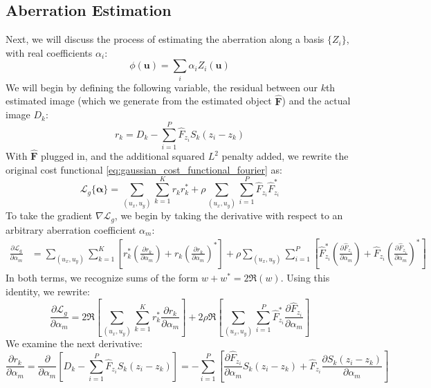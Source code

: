 \documentclass{article}
\begin{document}
\subsection{Aberration Estimation}
Next, we will discuss the process of estimating the aberration along a basis $\{Z_i\}$, with real coefficients $\alpha_i$:
\begin{equation}
\phi(\mathbf{u}) = \sum_i \alpha_i Z_i(\mathbf{u})
\end{equation}
We will begin by defining the following variable, the residual between our $k$th estimated image (which we generate from the estimated object $\hat{\mathbf{F}}$) and the actual image $D_k$:
\begin{equation}
r_k = D_k - \sum_{i=1}^P \hat{F}_{z_i} S_{k}(z_i - z_k)
\end{equation}
With $\hat{\mathbf{F}}$ plugged in, and the additional squared $L^2$ penalty added, we rewrite the original cost functional \autoref{eq:gaussian_cost_functional_fourier} as:
\begin{equation}
\mathcal{L}_g \{\bm{\alpha}\} = \sum_{(u_x, u_y)} \sum_{k=1}^K r_k r_k^*  + \rho \sum_{(u_x, u_y)} \sum_{i=1}^P \hat{F}_{z_i} \hat{F}^*_{z_i}
\end{equation}
To take the gradient $\nabla \mathcal{L}_g$, we begin by taking the derivative with respect to an arbitrary aberration coefficient $\alpha_m$:
\begin{align}
\frac{\partial \mathcal{L}_g}{\partial \alpha_m} &= \sum_{(u_x, u_y)} \sum_{k=1}^K \left[r_k^* \left(\frac{\partial r_k}{\partial \alpha_m} \right)  + r_k \left(\frac{\partial r_k}{\partial \alpha_m} \right)^*\right] + \rho \sum_{(u_x, u_y)} \sum_{i=1}^P \left[\hat{F}_{z_i}^* \left(\frac{\partial \hat{F}_{z_i}}{\partial \alpha_m} \right)  + \hat{F}_{z_i} \left(\frac{\partial \hat{F}_{z_i}}{\partial \alpha_m} \right)^*\right]
\end{align}
In both terms, we recognize sums of the form $w + w^* = 2 \Re(w)$. Using this identity, we rewrite:
\begin{equation}
\frac{\partial \mathcal{L}_g}{\partial \alpha_m} = 2 \Re \left[\sum_{(u_x, u_y)} \sum_{k=1}^K r_k^* \frac{\partial r_k}{\partial \alpha_m} \right] + 2 \rho \Re \left[\sum_{(u_x, u_y)} \sum_{i=1}^P \hat{F}_{z_i}^* \frac{\partial \hat{F}_{z_i}}{\partial \alpha_m} \right]
\end{equation}
We examine the next derivative:
\begin{equation}
\frac{\partial r_k}{\partial \alpha_m} = \frac{\partial}{\partial \alpha_m} \left[D_k - \sum_{i=1}^P \hat{F}_{z_i} S_k(z_i - z_k) \right] = - \sum_{i=1}^P \left[\frac{\partial \hat{F}_{z_i}}{\partial \alpha_m} S_k(z_i - z_k) + \hat{F}_{z_i} \frac{\partial S_k(z_i - z_k)}{\partial \alpha_m} \right]
\end{equation}
\end{document}
